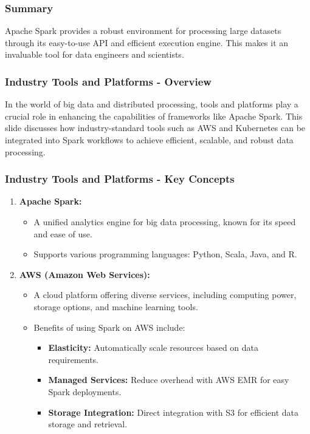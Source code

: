 \documentclass[aspectratio=169]{beamer}
\begin{document}
\begin{frame}[fragile]
  \frametitle{Summary}
  Apache Spark provides a robust environment for processing large datasets through its easy-to-use API and efficient execution engine. This makes it an invaluable tool for data engineers and scientists.
\end{frame}

\begin{frame}[fragile]
  \frametitle{Industry Tools and Platforms - Overview}
  In the world of big data and distributed processing, tools and platforms play a crucial role in enhancing the capabilities of frameworks like Apache Spark. This slide discusses how industry-standard tools such as AWS and Kubernetes can be integrated into Spark workflows to achieve efficient, scalable, and robust data processing.
\end{frame}

\begin{frame}[fragile]
  \frametitle{Industry Tools and Platforms - Key Concepts}
  \begin{enumerate}
    \item \textbf{Apache Spark:}
    \begin{itemize}
      \item A unified analytics engine for big data processing, known for its speed and ease of use.
      \item Supports various programming languages: Python, Scala, Java, and R.
    \end{itemize}

    \item \textbf{AWS (Amazon Web Services):}
    \begin{itemize}
      \item A cloud platform offering diverse services, including computing power, storage options, and machine learning tools.
      \item Benefits of using Spark on AWS include:
      \begin{itemize}
        \item \textbf{Elasticity:} Automatically scale resources based on data requirements.
        \item \textbf{Managed Services:} Reduce overhead with AWS EMR for easy Spark deployments.
        \item \textbf{Storage Integration:} Direct integration with S3 for efficient data storage and retrieval.
      \end{itemize}
    \end{itemize}
  \end{enumerate}
\end{frame}
\end{document}

